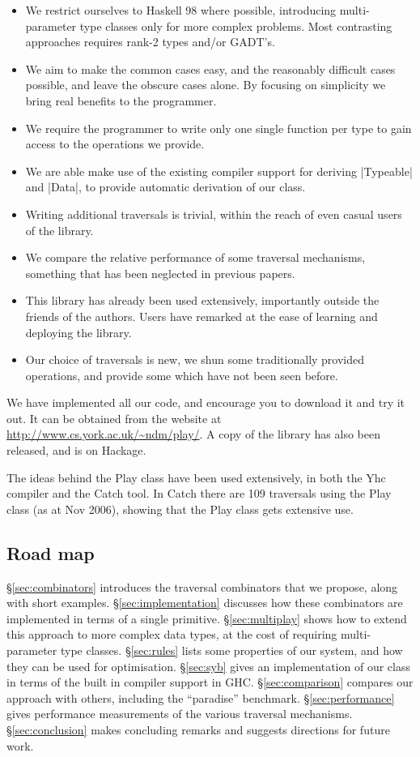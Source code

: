 \documentclass[preprint]{sigplanconf}
\begin{document}
\begin{itemize}
\item We restrict ourselves to Haskell 98 where possible, introducing multi-parameter type classes only for more complex problems. Most contrasting approaches requires rank-2 types and/or GADT's.
\item We aim to make the common cases easy, and the reasonably difficult cases possible, and leave the obscure cases alone. By focusing on simplicity we bring real benefits to the programmer.
\item We require the programmer to write only one single function per type to gain access to the operations we provide.
\item We are able make use of the existing compiler support for deriving |Typeable| and |Data|, to provide automatic derivation of our class.
\item Writing additional traversals is trivial, within the reach of even casual users of the library.
\item We compare the relative performance of some traversal mechanisms, something that has been neglected in previous papers.
\item This library has already been used extensively, importantly outside the friends of the authors. Users have remarked at the ease of learning and deploying the library.
\item Our choice of traversals is new, we shun some traditionally provided operations, and provide some which have not been seen before.
\end{itemize}

We have implemented all our code, and encourage you to download it and try it out. It can be obtained from the website at \url{http://www.cs.york.ac.uk/~ndm/play/}. A copy of the library has also been released, and is on Hackage.

The ideas behind the Play class have been used extensively, in both the Yhc compiler and the Catch tool. In Catch there are 109 traversals using the Play class (as at Nov 2006), showing that the Play class gets extensive use.

\subsection{Road map}

\S\ref{sec:combinators} introduces the traversal combinators that we propose, along with short examples. \S\ref{sec:implementation} discusses how these combinators are implemented in terms of a single primitive. \S\ref{sec:multiplay} shows how to extend this approach to more complex data types, at the cost of requiring multi-parameter type classes. \S\ref{sec:rules} lists some properties of our system, and how they can be used for optimisation. \S\ref{sec:syb} gives an implementation of our class in terms of the built in compiler support in GHC. \S\ref{sec:comparison} compares our approach with others, including the ``paradise'' benchmark. \S\ref{sec:performance} gives performance measurements of the various traversal mechanisms. \S\ref{sec:conclusion} makes concluding remarks and suggests directions for future work.
\end{document}
